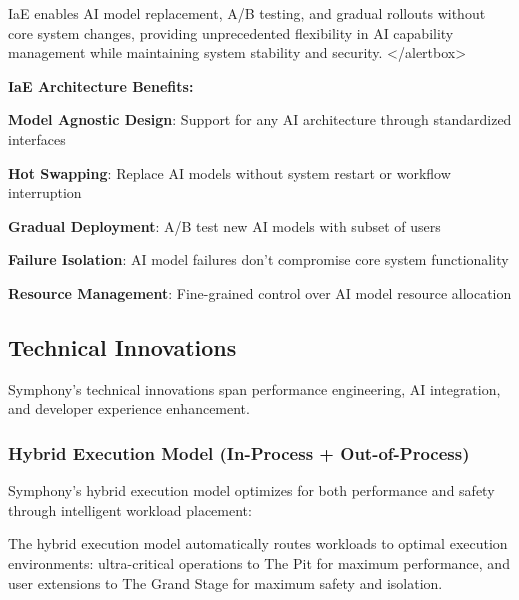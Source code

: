 \begin{successbox}
\begin{alertbox}
IaE enables AI model replacement, A/B testing, and gradual rollouts without core system changes, providing unprecedented flexibility in AI capability management while maintaining system stability and security.
</alertbox>

\textbf{IaE Architecture Benefits:}

\begin{expandedlist}
    \item \textbf{Model Agnostic Design}: Support for any AI architecture through standardized interfaces
    
    \item \textbf{Hot Swapping}: Replace AI models without system restart or workflow interruption
    
    \item \textbf{Gradual Deployment}: A/B test new AI models with subset of users
    
    \item \textbf{Failure Isolation}: AI model failures don't compromise core system functionality
    
    \item \textbf{Resource Management}: Fine-grained control over AI model resource allocation
\end{expandedlist}

\subsection{Technical Innovations}
\label{subsec:technical-innovations}

Symphony's technical innovations span performance engineering, AI integration, and developer experience enhancement.

\subsubsection{Hybrid Execution Model (In-Process + Out-of-Process)}

Symphony's hybrid execution model optimizes for both performance and safety through intelligent workload placement:

\begin{infobox}[title=Execution Model Innovation: Performance Meets Safety]
The hybrid execution model automatically routes workloads to optimal execution environments: ultra-critical operations to The Pit for maximum performance, and user extensions to The Grand Stage for maximum safety and isolation.
\end{infobox}


\end{alertbox}
\end{successbox}
